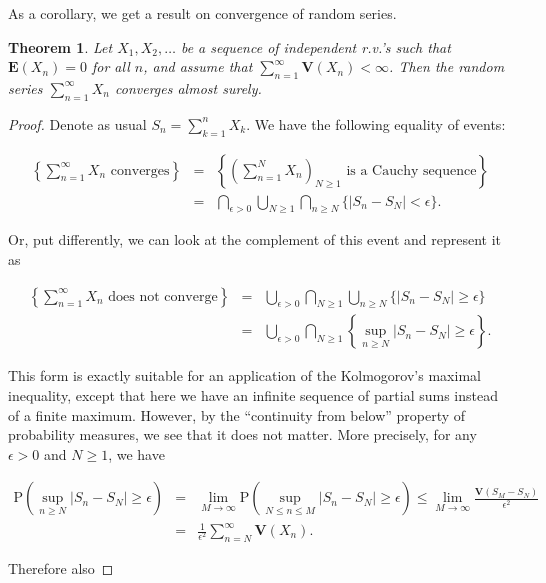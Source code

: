 \documentclass[11pt]{report}
\theoremstyle{plain}
\newtheorem{thm}{Theorem}[chapter]
\theoremstyle{definition}
\begin{document}
As a corollary, we get a result on convergence of
random series.

\begin{thm}
\label{thm-one-series}
Let $X_1,X_2,\ldots$ be a sequence of independent
r.v.'s such that $\mathbf{E}(X_n)=0$ for all $n$, and
assume that
$\sum_{n=1}^\infty \mathbf{V}(X_n) < \infty$. Then
the random series $\sum_{n=1}^\infty X_n$ converges
almost surely.
\end{thm}

\begin{proof}
Denote as usual $S_n = \sum_{k=1}^n X_k$. We have the
following equality of events:

\begin{eqnarray*}
\left\{ \sum_{n=1}^\infty X_n\textrm{ converges}
\right\}
&=&
\left\{ \left(\sum_{n=1}^N X_n\right)_{N\ge 1} \textrm{ is a Cauchy sequence}
\right\} \\
&=&
\bigcap_{\epsilon>0}
\bigcup_{N\ge 1}
\bigcap_{n\ge N}
\Big\{
|S_n-S_N|<\epsilon
\Big\}.
\end{eqnarray*}

Or, put differently, we can look at the complement
of this event and represent it as

\begin{eqnarray*}
\left\{ \sum_{n=1}^\infty X_n\textrm{ does not converge}
\right\}
&=&
\bigcup_{\epsilon>0}
\bigcap_{N\ge 1}
\bigcup_{n\ge N}
\Big\{
|S_n-S_N|\ge\epsilon
\Big\} \\
&=&
\bigcup_{\epsilon>0}
\bigcap_{N\ge 1}
\left\{ \sup_{n\ge N}
|S_n-S_N|\ge\epsilon
\right\}.
\end{eqnarray*}

This form is exactly suitable for an application of
the Kolmogorov's maximal inequality, except that here
we have an infinite sequence of partial sums instead
of a finite maximum. However, by the ``continuity from
below'' property of probability measures, we see that
it does not matter. More precisely, for any
$\epsilon>0$ and $N\ge 1$, we have

\begin{eqnarray*}
\mathrm{P}\left(
\sup_{n\ge N}
|S_n-S_N|\ge\epsilon
\right) &=& \lim_{M\to\infty} \mathrm{P}\left(
\sup_{N\le n\le M}
|S_n-S_N|\ge\epsilon
\right) \le \lim_{M\to\infty} \frac{\mathbf{V}(S_M-S_N)}{\epsilon^2} \\ &=& \frac{1}{\epsilon^2} \sum_{n=N}^\infty \mathbf{V}(X_n).
\end{eqnarray*}

Therefore also


\end{proof}
\end{document}
